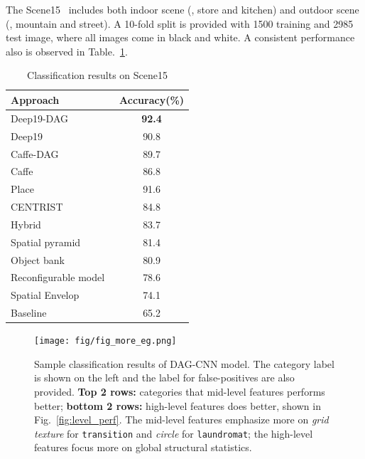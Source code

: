 \documentclass[10pt,twocolumn,letterpaper]{article}
\begin{document}
The Scene15~\cite{Scene15} includes both indoor scene (\eg, store and kitchen) and outdoor scene (\eg, mountain and street). A 10-fold split is provided with 1500 training and 2985 test image, where all images come in black and white. A consistent performance also is observed in Table.~\ref{table:Scene15}. 

\begin{table}[htbp]
\begin{center}
\begin{tabular}{|l|c|}
\hline
Approach & Accuracy(\%) \\
\hline
Deep19-DAG & \textbf{92.4} \\
Deep19~\cite{veryDeep} & 90.8 \\
Caffe-DAG & 89.7	\\
Caffe~\cite{Caffe} & 86.8 \\ \hline
Place~\cite{zhoulearning} & 91.6 \\
CENTRIST~\cite{Wu_pami11} & 84.8	\\
Hybrid~\cite{Bosch_pami08}	& 83.7	\\
Spatial pyramid~\cite{spatial_pyramid} & 81.4 \\
Object bank~\cite{Li_nips10_objectbank}	& 80.9	\\
Reconfigurable model~\cite{Parizi_cvpr12_reconf} & 78.6	\\
Spatial Envelop~\cite{Oliva_ijcv01_envelop} & 74.1 \\
Baseline~\cite{Scene15} & 65.2 \\
\hline
\end{tabular}
\end{center}
\caption{Classification results on Scene15}
\label{table:Scene15}
\end{table}



\begin{figure}[htbp]
\centering
	\texttt{[image: fig/fig\_more\_eg.png]}
\caption{Sample classification results of DAG-CNN model. The category label is shown on the left and the label for false-positives are also provided. \textbf{Top 2 rows:} categories that mid-level features performs better; \textbf{bottom 2 rows:} high-level features does better, shown in Fig.~\ref{fig:level_perf}. The mid-level features emphasize more on \textit{grid texture} for {\tt transition} and \textit{circle} for {\tt laundromat}; the high-level features focus more on global structural statistics.}

\label{fig:more_eg}
\end{figure}
\end{document}
